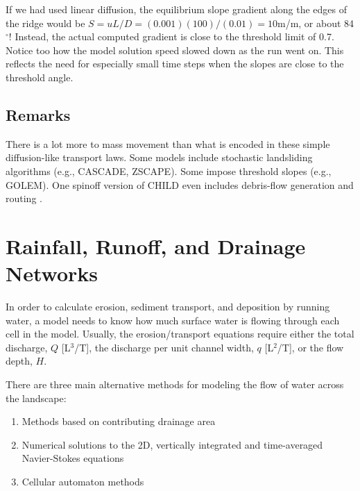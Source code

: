 \documentclass[12pt]{amsart}
\begin{document}
{\em
{}
If we had used linear diffusion, the equilibrium slope gradient along the edges of the ridge would be $S = uL/D = (0.001)(100)/(0.01) = 10$m/m, or about 84$^\circ$! Instead, the actual computed gradient is close to the threshold limit of 0.7. Notice too how the model solution speed slowed down as the run went on. This reflects the need for especially small time steps when the slopes are close to the threshold angle.
}

\subsection{Remarks}

There is a lot more to mass movement than what is encoded in these simple diffusion-like transport laws. Some models include stochastic landsliding algorithms (e.g., CASCADE, ZSCAPE). Some impose threshold slopes (e.g., GOLEM). One spinoff version of CHILD even includes debris-flow generation and routing \citep{lancaster2003effects}.

\section{Rainfall, Runoff, and Drainage Networks}

In order to calculate erosion, sediment transport, and deposition by running water, a model needs to know how much surface water is flowing through each cell in the model. Usually, the erosion/transport equations require either the total discharge, $Q$ [L$^3$/T], the discharge per unit channel width, $q$ [L$^2$/T], or the flow depth, $H$.

There are three main alternative methods for modeling the flow of water across the landscape:
\begin{enumerate}
\item Methods based on contributing drainage area
\item Numerical solutions to the 2D, vertically integrated and time-averaged Navier-Stokes equations
\item Cellular automaton methods
\end{enumerate}
\end{document}
